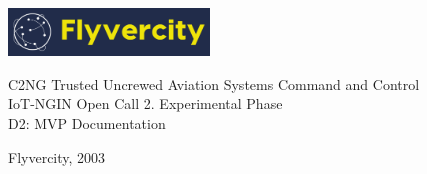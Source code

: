 \documentclass[a4paper]{article}
\begin{document}
 
\thispagestyle{empty}
\begin{flushright}
    \includegraphics[width=0.4\textwidth]{docs/images/Logo.png}
\end{flushright}
\vfill
\begin{center}
    {\LARGE C2NG Trusted Uncrewed Aviation Systems Command and Control} \\
    \vspace{1cm}
    {\Large IoT-NGIN Open Call 2. Experimental Phase} \\
    \vspace{1cm}
    {\Large D2: MVP Documentation}
\end{center}
\vfill
\begin{center}
    Flyvercity, 2003
\end{center}
\end{document}
